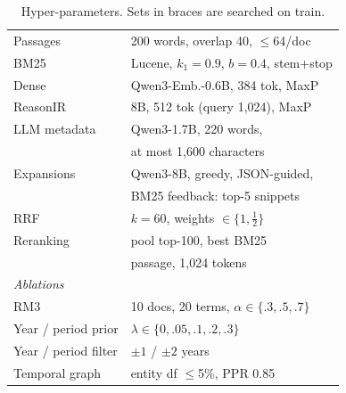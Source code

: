 \begin{table}[h]
\centering
\small
\setlength{\tabcolsep}{3pt}
\caption{Compute per stage on NVIDIA A100 80\,GB GPUs (GPU-h: A100-hours). BM25 indexing,
fusion and evaluation run on CPU.}
\label{tab:compute}
\end{table}

\begin{table}[h]
\centering\small
\begin{tabular}{ll}
\toprule
Passages & 200 words, overlap 40, $\leq$64/doc \\
BM25 & Lucene, $k_1{=}0.9$, $b{=}0.4$, stem+stop \\
Dense & Qwen3-Emb.-0.6B, 384 tok, MaxP \\
ReasonIR & 8B, 512 tok (query 1{,}024), MaxP \\
LLM metadata & Qwen3-1.7B, 220 words, \\
 & at most 1{,}600 characters \\
Expansions & Qwen3-8B, greedy, JSON-guided, \\
 & BM25 feedback: top-5 snippets \\
RRF & $k{=}60$, weights $\in\{1,\tfrac12\}$ \\
Reranking & pool top-100, best BM25 \\
 & passage, 1{,}024 tokens \\
\midrule
\multicolumn{2}{l}{\textit{Ablations}} \\
RM3 & 10 docs, 20 terms, $\alpha\in\{.3,.5,.7\}$ \\
Year / period prior & $\lambda\in\{0,.05,.1,.2,.3\}$ \\
Year / period filter & $\pm1$ / $\pm2$ years \\
Temporal graph & entity df $\leq$5\%, PPR 0.85 \\
\bottomrule
\end{tabular}
\caption{Hyper-parameters. Sets in braces are searched on train.}
\end{table}

